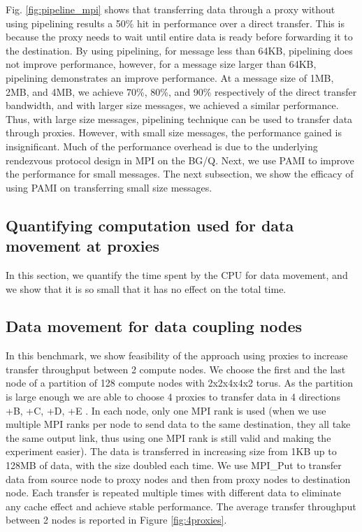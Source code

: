 Fig. \ref{fig:pipeline_mpi} shows that transferring data through a proxy without using pipelining results a 50\% hit in performance over a direct transfer. This is because the proxy needs to wait until entire data is ready before forwarding it to the destination. By using pipelining, for message less than 64KB,  pipelining does not improve performance, however, for a message size larger than 64KB, pipelining demonstrates an improve performance. At a  message size of 1MB, 2MB, and 4MB, we achieve 70\%, 80\%, and  90\% respectively of the direct transfer bandwidth, and with larger size messages, we achieved a similar performance. Thus, with large size messages, pipelining technique can be used to transfer data through proxies. However, with small size messages, the performance gained is insignificant. Much of the performance overhead is due to the underlying rendezvous protocol design in MPI on the BG/Q. Next, we use PAMI to improve the performance for small messages. The next subsection, we show the efficacy of using PAMI on transferring small size messages.

\subsection{Quantifying computation used for data movement at proxies}
In this section, we quantify the time spent by the CPU for data movement, and we show that it is so small that it has no effect on the total time.

\subsection{Data movement for data coupling nodes}
In this benchmark, we show feasibility of the approach using proxies to increase transfer throughput between 2 compute nodes. We choose the first and the last node of a partition of 128 compute nodes with 2x2x4x4x2 torus. As the partition is large enough we are able to choose 4 proxies to transfer data in 4 directions +B, +C, +D, +E . In each node, only one MPI rank is used (when we use multiple MPI ranks per node to send data to the same destination, they all take the same output link, thus using one MPI rank is still valid and making the experiment easier). The data is transferred in increasing size from 1KB up to 128MB of data, with the size doubled each time. We use MPI\_Put to transfer data from source node to proxy nodes and then from proxy nodes to destination node. Each transfer is repeated multiple times with different data to eliminate any cache effect and achieve stable performance. The average transfer throughput between 2 nodes is reported in Figure \ref{fig:4proxies}.

